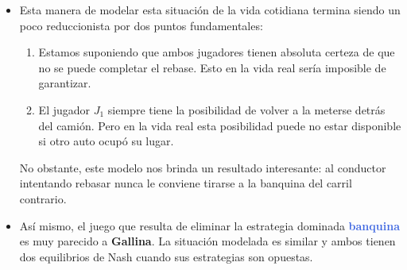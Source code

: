 \documentclass{article}
\newcommand{\stratU}[1]{\textbf{\textcolor{RoyalBlue}{#1}}}
\begin{document}
\begin{itemize}
    \item  Esta manera de modelar esta situación de la vida cotidiana termina siendo un poco reduccionista por dos puntos fundamentales:

\begin{enumerate}
    \item Estamos suponiendo que ambos jugadores tienen absoluta certeza de que no se puede completar el rebase. Esto en la vida real sería imposible de garantizar.
    \item El jugador $J_1$ siempre tiene la posibilidad de volver a la meterse detrás del camión. Pero en la vida real esta posibilidad puede no estar disponible si otro auto ocupó su lugar.
\end{enumerate}

 No obstante, este modelo nos brinda un resultado interesante: al conductor intentando rebasar nunca le conviene tirarse a la banquina del carril contrario.

\item Así mismo, el juego que resulta de eliminar la estrategia dominada \stratU{banquina} es muy parecido a \textbf{Gallina}. La situación modelada es similar y ambos tienen dos equilibrios de Nash cuando sus estrategias son opuestas.

\end{itemize}
\end{document}
